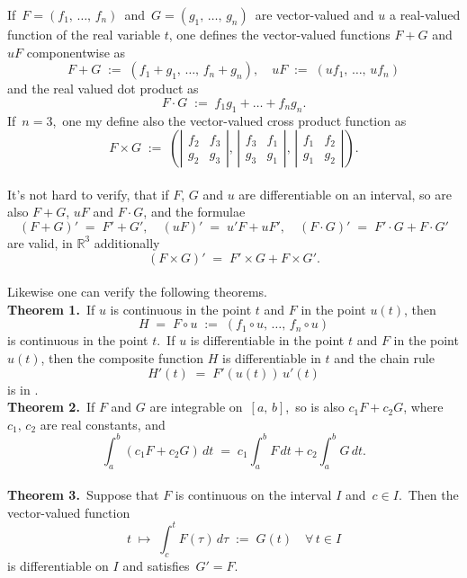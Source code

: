\documentclass[12pt]{article}
\theoremstyle{definition}
\begin{document}
If\, $F = (f_1,\,\ldots,\,f_n)$\, and\, $G = (g_1,\,\ldots,\,g_n)$\, are vector-valued and $u$ a real-valued function of the real variable $t$, one defines the vector-valued functions $F\!+\!G$ and $uF$ componentwise as
$$F\!+\!G \;:=\; (f_1\!+\!g_1,\,\ldots,\,f_n\!+\!g_n), \quad uF \;:=\; (uf_1,\,\ldots,\,uf_n)$$
and the real valued dot product as
$$F \cdot G \;:=\; f_1g_1\!+\ldots+\!f_ng_n.$$
If\, $n = 3$,\, one my define also the vector-valued cross product function as
$$F\!\times\!G \;:=\; 
\left( 
\left|\begin{matrix}
f_2 & f_3 \\
g_2 & g_3
\end{matrix}\right|\!,\, 
\left|\begin{matrix}
f_3 & f_1 \\
g_3 & g_1
\end{matrix}\right|\!,\,
\left|\begin{matrix}
f_1 & f_2 \\
g_1 & g_2
\end{matrix}\right|
\right)\!.$$\\

It's not hard to verify, that if $F$, $G$ and $u$ are differentiable on an interval, so are also
$F\!+\!G$, $uF$ and $F\cdot G$, and the formulae
$$(F\!+\!G)' \;=\; F'\!+\!G', \quad (uF)' \;=\; u'F\!+\!uF', \quad (F\cdot G)' \;=\; F'\cdot G+F\cdot G'$$
are valid, in $\mathbb{R}^3$ additionally
$$(F\!\times\!G)' \;=\; F'\!\times\!G+F\!\times\!G'.$$\\

Likewise one can verify the following theorems.\\

\textbf{Theorem 1.}\, If $u$ is continuous in the point $t$ and $F$ in the point $u(t)$, then
$$H \;=\; F\!\circ\!u \;:=\; (f_1\!\circ\!u,\,\ldots,\,f_n\!\circ\!u)$$
is continuous in the point $t$.\, If $u$ is differentiable in the point $t$ and $F$ in the point $u(t)$, then the composite function $H$ is differentiable in $t$ and the chain rule
$$H'(t) \;=\; F'(u(t))\,u'(t)$$
is in .\\

\textbf{Theorem 2.}\, If $F$ and $G$ are integrable on\, $[a,\,b]$,\, so is also $c_1F\!+\!c_2G$, where $c_1,\,c_2$ are real constants, and 
$$\int_a^b\!(c_1F\!+\!c_2G)\,dt \;=\; c_1\int_a^b\!F\,dt+c_2\int_a^b\!G\,dt.$$\\

\textbf{Theorem 3.}\, Suppose that $F$ is continuous on the interval $I$ and\, $c \in I$.\, Then the vector-valued function 
$$t\; \mapsto\; \int_c^t\!F(\tau)\,d\tau \;:=\; G(t) \quad \forall\, t \in I$$
is differentiable on $I$ and satisfies\, $G' = F$.\\
\end{document}
